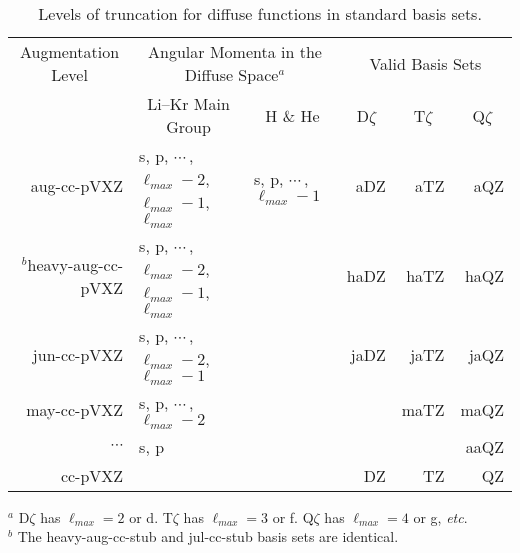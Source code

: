 \begin{table}[!htbp]
\begin{footnotesize}
\caption{Levels of truncation for diffuse functions in standard basis sets. \label{table:basisMonths}}
\parsep 10pt
\begin{center}
\begin{tabular}{rllrrr}
\hline\hline
\multicolumn{1}{c}{Augmentation Level} &
\multicolumn{2}{c}{Angular Momenta in the Diffuse Space$^a$} &
\multicolumn{3}{c}{Valid Basis Sets} \\
\cline{2-3}\cline{4-6}
&
\multicolumn{1}{c}{Li--Kr Main Group} &
\multicolumn{1}{c}{H \& He} &
\multicolumn{1}{c}{D$\zeta$} &
\multicolumn{1}{c}{T$\zeta$} &
\multicolumn{1}{c}{Q$\zeta$} \\
\hline
aug-cc-pVXZ             & s, p, $\cdots\,$, $\ell_{max}-2$, $\ell_{max}-1$, $\ell_{max}$ & s, p, $\cdots\,$, $\ell_{max}-1$ &  aDZ &  aTZ &  aQZ \\
$^b$heavy-aug-cc-pVXZ   & s, p, $\cdots\,$, $\ell_{max}-2$, $\ell_{max}-1$, $\ell_{max}$ &                                  & haDZ & haTZ & haQZ \\
jun-cc-pVXZ             & s, p, $\cdots\,$, $\ell_{max}-2$, $\ell_{max}-1$               &                                  & jaDZ & jaTZ & jaQZ \\
may-cc-pVXZ             & s, p, $\cdots\,$, $\ell_{max}-2$                               &                                  &      & maTZ & maQZ \\
$\cdots$                & s, p                                                           &                                  &      &      & aaQZ \\
cc-pVXZ                 &                                                                &                                  &   DZ &   TZ &   QZ \\
\hline\hline
\end{tabular}
\end{center}
$^a$ \mbox{D$\zeta$} has $\ell_{max}=2$ or d. \mbox{T$\zeta$} has $\ell_{max}=3$ or f. \mbox{Q$\zeta$} has $\ell_{max}=4$ or g, \textit{etc}. \\
$^b$ The heavy-aug-cc-stub and jul-cc-stub basis sets are identical.
\end{footnotesize}
\end{table}


